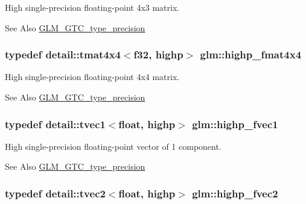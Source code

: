 High single-\/precision floating-\/point 4x3 matrix. \begin{DoxySeeAlso}{See Also}
\hyperlink{group__gtc__type__precision}{G\-L\-M\-\_\-\-G\-T\-C\-\_\-type\-\_\-precision} 
\end{DoxySeeAlso}
\hypertarget{group__gtc__type__precision_gaf0a98d6caffce89da963d3430e05ddb0}{
\subsubsection[{highp\-\_\-fmat4x4}]{\setlength{\rightskip}{0pt plus 5cm}typedef detail\-::tmat4x4$<$f32, highp$>$ {\bf glm\-::highp\-\_\-fmat4x4}}}\label{group__gtc__type__precision_gaf0a98d6caffce89da963d3430e05ddb0}
High single-\/precision floating-\/point 4x4 matrix. \begin{DoxySeeAlso}{See Also}
\hyperlink{group__gtc__type__precision}{G\-L\-M\-\_\-\-G\-T\-C\-\_\-type\-\_\-precision} 
\end{DoxySeeAlso}
\hypertarget{group__gtc__type__precision_ga5d9f2208253856df60a57925f92ff0c8}{
\subsubsection[{highp\-\_\-fvec1}]{\setlength{\rightskip}{0pt plus 5cm}typedef detail\-::tvec1$<$float, highp$>$ {\bf glm\-::highp\-\_\-fvec1}}}\label{group__gtc__type__precision_ga5d9f2208253856df60a57925f92ff0c8}
High single-\/precision floating-\/point vector of 1 component. \begin{DoxySeeAlso}{See Also}
\hyperlink{group__gtc__type__precision}{G\-L\-M\-\_\-\-G\-T\-C\-\_\-type\-\_\-precision} 
\end{DoxySeeAlso}
\hypertarget{group__gtc__type__precision_gab58ecc53699d45f4f88d67bbff084c54}{
\subsubsection[{highp\-\_\-fvec2}]{\setlength{\rightskip}{0pt plus 5cm}typedef detail\-::tvec2$<$float, highp$>$ {\bf glm\-::highp\-\_\-fvec2}}}\label{group__gtc__type__precision_gab58ecc53699d45f4f88d67bbff084c54}

